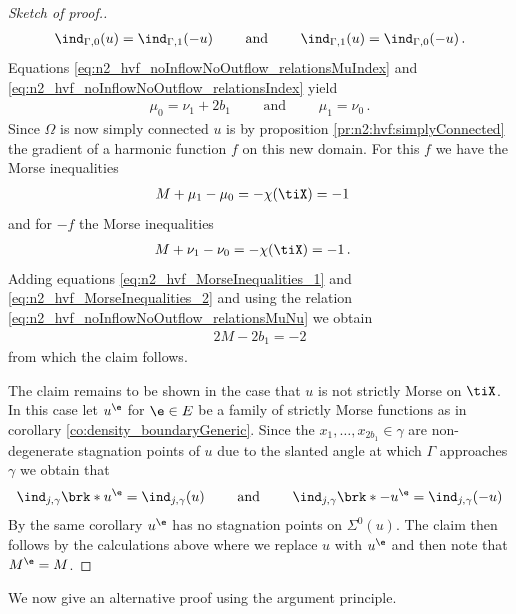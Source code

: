 \begin{proof}[Sketch of proof.]
  \begin{align}
    \ind_{\Gamma,0}(u)=\ind_{\Gamma,1}(-u) \qquad\text{ and }\qquad
    \ind_{\Gamma,1}(u)=\ind_{\Gamma,0}(-u)\,.\label{eq:n2_hvf_noInflowNoOutflow_relationsIndex}
  \end{align}
  Equations \eqref{eq:n2_hvf_noInflowNoOutflow_relationsMuIndex} and \eqref{eq:n2_hvf_noInflowNoOutflow_relationsIndex}
  yield 
  \begin{align}
    \mu_0=\nu_1+2b_1 \qquad\text{ and }\qquad
    \mu_1=\nu_0\,.\label{eq:n2_hvf_noInflowNoOutflow_relationsMuNu}
  \end{align}
  Since $\Omega$ is now simply connected $u$ is 
  by proposition \ref{pr:n2:hvf:simplyConnected}
  the gradient of a harmonic function $f$ on this new domain.
  For this $f$ we have the Morse inequalities
  \begin{align}
    M+\mu_1-\mu_0&=-\chi(\tiX)=-1 \label{eq:n2_hvf_MorseInequalities_1}
  \end{align}
  and for $-f$ the Morse inequalities
  \begin{align}
    M+\nu_1-\nu_0&=-\chi(\tiX)=-1\,. \label{eq:n2_hvf_MorseInequalities_2}
  \end{align}
  Adding equations \eqref{eq:n2_hvf_MorseInequalities_1} and \eqref{eq:n2_hvf_MorseInequalities_2} and using the relation
  \eqref{eq:n2_hvf_noInflowNoOutflow_relationsMuNu} we obtain
  \begin{align*}
    2M-2b_1=-2
  \end{align*}
  from which the claim follows.

  The claim remains to be shown in the case that $u$ is not strictly Morse on $\tiX$. In this case let
  $u^\e$ for $\e\in E$ be a family of strictly Morse functions as in corollary \ref{co:density_boundaryGeneric}.
  Since the $x_1,\dots,x_{2b_1}\in\gamma$ are non-degenerate stagnation points of $u$
  due to the slanted angle at which
  $\Gamma$ approaches $\gamma$
  we obtain that
  \begin{align}
    \ind_{j,\gamma}\brk*{u^\e}=\ind_{j,\gamma}(u)\qquad\text{ and }\qquad 
    \ind_{j,\gamma}\brk*{-u^\e}=\ind_{j,\gamma}(-u)
    \label{eq:n3_disproof_morse_indexApprox}
  \end{align}
  By the same corollary $u^\e$ has no stagnation points on $\Sigma^0(u)$.
  The claim then follows by the calculations above where we replace
  $u$ with $u^\e$ and then note that $M^\e=M$.
\end{proof}
We now give an alternative proof using the argument principle.
